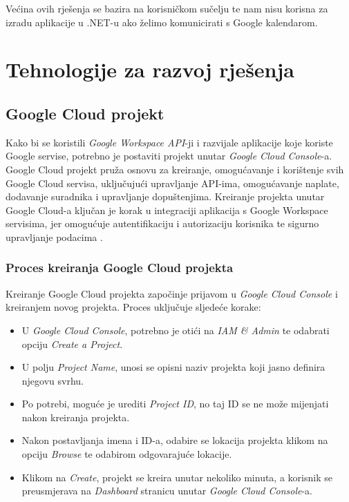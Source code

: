 \documentclass{foi}
\begin{document}
Većina ovih rješenja se bazira na korisničkom sučelju te nam nisu korisna za izradu aplikacije u .NET-u ako želimo komunicirati s Google kalendarom.
\chapter{Tehnologije za razvoj rješenja}
\section{Google Cloud projekt}

Kako bi se koristili \textit{Google Workspace API}-ji i razvijale aplikacije koje koriste Google servise, potrebno je postaviti projekt unutar \textit{Google Cloud Console}-a. Google Cloud projekt pruža osnovu za kreiranje, omogućavanje i korištenje svih Google Cloud servisa, uključujući upravljanje API-ima, omogućavanje naplate, dodavanje suradnika i upravljanje dopuštenjima. Kreiranje projekta unutar Google Cloud-a ključan je korak u integraciji aplikacija s Google Workspace servisima, jer omogućuje autentifikaciju i autorizaciju korisnika te sigurno upravljanje podacima \cite{GoogleWorkspace2024}.

\subsection{Proces kreiranja Google Cloud projekta}

Kreiranje Google Cloud projekta započinje prijavom u \textit{Google Cloud Console} i kreiranjem novog projekta. Proces uključuje sljedeće korake:
\begin{itemize}
    \item U \textit{Google Cloud Console}, potrebno je otići na \textit{IAM \& Admin} te odabrati opciju \textit{Create a Project}.
    \item U polju \textit{Project Name}, unosi se opisni naziv projekta koji jasno definira njegovu svrhu.
    \item Po potrebi, moguće je urediti \textit{Project ID}, no taj ID se ne može mijenjati nakon kreiranja projekta.
    \item Nakon postavljanja imena i ID-a, odabire se lokacija projekta klikom na opciju \textit{Browse} te odabirom odgovarajuće lokacije.
    \item Klikom na \textit{Create}, projekt se kreira unutar nekoliko minuta, a korisnik se preusmjerava na \textit{Dashboard} stranicu unutar \textit{Google Cloud Console}-a.
\end{itemize}
\end{document}
